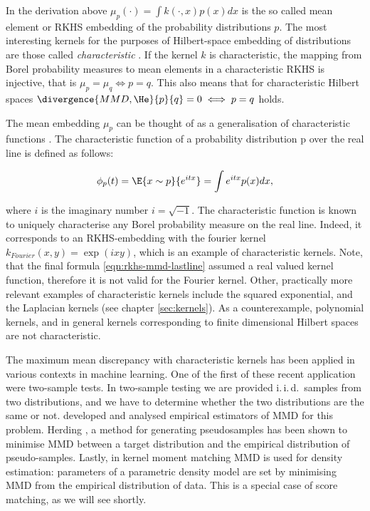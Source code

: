 In the derivation above $\mu_p(\cdot) = \int k(\cdot,x) p(x) dx$ is the so called mean element or RKHS embedding of the probability distributions $p$. The most interesting kernels for the purposes of Hilbert-space embedding of distributions are those called \emph{characteristic} \cite{}. If the kernel $k$ is characteristic, the mapping from Borel probability measures to mean elements in a characteristic RKHS is injective, that is $\mu_p = \mu_q \iff p = q$. This also means that for characteristic Hilbert spaces $\divergence{MMD,\He}{p}{q} = 0 \iff p=q$ holds.

The mean embedding $\mu_p$ can be thought of as a generalisation of characteristic functions \cite{}. The characteristic function of a probability distribution p over the real line is defined as follows:

\begin{equation}
\phi_p(t) = \E{x\sim p}{e^{ i t x}} = \int e^{i t x} p(x) dx,
\end{equation}

where $i$ is the imaginary number $i=\sqrt{-1}$. The characteristic function is known to uniquely characterise any Borel probability measure on the real line. Indeed, it corresponds to an RKHS-embedding with the fourier kernel $k_{Fourier}(x,y) = \exp(ixy)$, which is an example of characteristic kernels. Note, that the final formula \ref{eqn:rkhs-mmd-lastline} assumed a real valued kernel function, therefore it is not valid for the Fourier kernel. Other, practically more relevant examples of characteristic kernels include the squared exponential, and the Laplacian kernels (see chapter \ref{sec:kernels}). As a counterexample, polynomial kernels, and in general kernels corresponding to finite dimensional Hilbert spaces are not characteristic.

The maximum mean discrepancy with characteristic kernels has been applied in various contexts in machine learning. One of the first of these recent application were two-sample tests. In two-sample testing we are provided i.\,i.\,d.\ samples from two distributions, and we have to determine whether the two distributions are the same or not. \cite{} developed and analysed empirical estimators of MMD for this problem. Herding \cite{}, a method for generating pseudosamples has been shown to minimise MMD between a target distribution and the empirical distribution of pseudo-samples. Lastly, in kernel moment matching \cite{SmolaShaweTaylor} MMD is used for density estimation: parameters of a parametric density model are set by minimising MMD from the empirical distribution of data. This is a special case of score matching, as we will see shortly.

